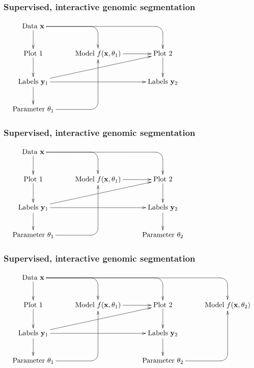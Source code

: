 \documentclass{beamer}
\begin{document}
\begin{frame}
  \frametitle{Supervised, interactive genomic segmentation}
  \small
  \begin{displaymath}
  \xymatrix{
    \text{Data $\mathbf x$}
    \ar `[r] [dr] 
    \ar `r[rr] [drr] 
    \ar [d]
    & \text{ }
    & \text{ }
    & \text{ }
    \\
    \text{Plot 1} 
    \ar [d]
    & 
    \text{Model $f(\mathbf x, \theta_1)$} 
    \ar [r]
    &
    \text{Plot 2} 
    \ar [d]
    & 
    \color{white}{\text{Model $f(\mathbf x, \theta_2)$} }
    \\
    \text{Labels $\mathbf y_1$}       
    \ar [d]
    \ar [rr]
    \ar [rru]
    &
    &
    \text{Labels $\mathbf y_2$}
    \\
    \text{Parameter $\theta_1$} 
    \ar `r[ruu] [ruu]
    & \text{ }
    & 
    \color{white}{\text{Parameter $\theta_2$}}
  }
  \end{displaymath}
\end{frame}

\begin{frame}
  \frametitle{Supervised, interactive genomic segmentation}
  \small
  \begin{displaymath}
  \xymatrix{
    \text{Data $\mathbf x$}
    \ar `[r] [dr] 
    \ar `r[rr] [drr] 
    \ar [d]
    & \text{ }
    & \text{ }
    & \text{ }
    \\
    \text{Plot 1} 
    \ar [d]
    & 
    \text{Model $f(\mathbf x, \theta_1)$} 
    \ar [r]
    &
    \text{Plot 2} 
    \ar [d]
    & 
    \color{white}{\text{Model $f(\mathbf x, \theta_2)$} }
    \\
    \text{Labels $\mathbf y_1$}       
    \ar [d]
    \ar [rr]
    \ar [rru]
    &
    &
    \text{Labels $\mathbf y_2$}
    \ar [d]
    \\
    \text{Parameter $\theta_1$} 
    \ar `r[ruu] [ruu]
    & \text{ }
    & \text{Parameter $\theta_2$}
  }
  \end{displaymath}
\end{frame}


\begin{frame}
  \frametitle{Supervised, interactive genomic segmentation}
  \small
  \begin{displaymath}
  \xymatrix{
    \text{Data $\mathbf x$}
    \ar `[r] [dr] 
    \ar `r[rr] [drr] 
    \ar `r[rrr] [drrr] 
    \ar [d]
    & \text{ }
    & \text{ }
    & \text{ }
    \\
    \text{Plot 1} 
    \ar [d]
    & 
    \text{Model $f(\mathbf x, \theta_1)$} 
    \ar [r]
    &
    \text{Plot 2} 
    \ar [d]
    & 
    \text{Model $f(\mathbf x, \theta_2)$} 
    \\
    \text{Labels $\mathbf y_1$}       
    \ar [d]
    \ar [rr]
    \ar [rru]
    &
    &
    \text{Labels $\mathbf y_2$}
    \ar [d]
    \\
    \text{Parameter $\theta_1$} 
    \ar `r[ruu] [ruu]
    & \text{ }
    & \text{Parameter $\theta_2$}
    \ar `r[ruu] [ruu]
  }
  \end{displaymath}
\end{frame}
\end{document}
